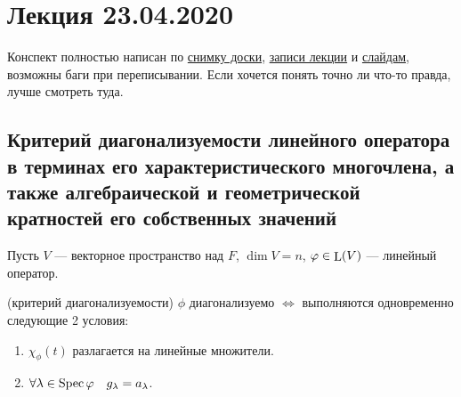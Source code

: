 \section{Лекция 23.04.2020} 

Конспект полностью написан по
\href{https://www.dropbox.com/s/ze7leityir3zbqo/LA_19-20_osn_Lecture29.svg?dl=0}{снимку доски}, 
\href{https://www.youtube.com/watch?v=_J8hatdsSrM}{записи лекции} и
\href{https://www.dropbox.com/s/as7uz9v74ba9u5f/LinOperators2.pdf?dl=0}{слайдам},
возможны баги при переписывании. Если хочется понять точно ли что-то правда, лучше смотреть туда.


\subsection{Критерий диагонализуемости линейного оператора в терминах его характеристического многочлена, а также алгебраической и геометрической кратностей его собственных значений}

Пусть $V$ --- векторное пространство над $F$, $\dim V = n$, $\varphi \in \operatorname{\mathop{\mathrm{L}}}(V)$ --- линейный оператор.

\begin{theorem}{(критерий диагонализуемости)}
    $\phi$ диагонализуемо $\iff$ выполняются одновременно следующие 2 условия:
    \begin{enumerate}
    \item $\chi_\phi(t)$ разлагается на линейные множители.
    \item $\forall \lambda \in \operatorname{\mathop{\mathrm{Spec}}} \varphi \quad g_\lambda = a_\lambda$.
    \end{enumerate}
\end{theorem}

